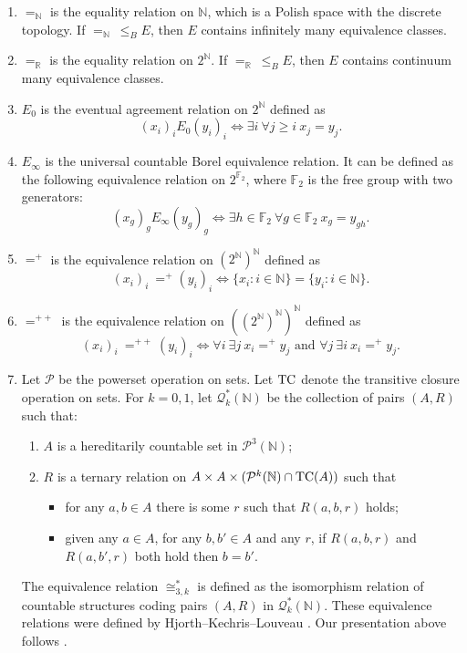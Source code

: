 \documentclass{amsart}
\theoremstyle{definition}
\theoremstyle{remark}
\begin{document}
\begin{enumerate}
\item $=_{\mathbb{N}}$ is the equality relation on $\mathbb{N}$, which is a Polish space with the discrete topology. If $=_{\mathbb{N}}\ \leq_B E$, then $E$ contains infinitely many equivalence classes.
\item $=_{\mathbb{R}}$ is the equality relation on $2^{\mathbb{N}}$. If $=_{\mathbb{R}}\ \leq_B E$, then $E$ contains continuum many equivalence classes.
\item $E_0$ is the eventual agreement relation on $2^{\mathbb{N}}$ defined as
$$ (x_i)_iE_0(y_i)_i\iff \exists i\ \forall j\geq i\ x_j=y_j. $$
\item $E_\infty$ is the universal countable Borel equivalence relation. It can be defined as the following equivalence relation on $2^{\mathbb{F}_2}$, where $\mathbb{F}_2$ is the free group with two generators:
$$ (x_g)_gE_\infty (y_g)_g \iff \exists h\in \mathbb{F}_2\ \forall g\in \mathbb{F}_2\ x_g=y_{gh}. $$
\item $=^+$ is the equivalence relation on $(2^\mathbb{N})^{\mathbb{N}}$ defined as
$$ (x_i)_i\ =^+ (y_i)_i\iff \{x_i\colon i\in \mathbb{N}\}=\{y_i\colon i\in\mathbb{N}\}. $$
\item $=^{++}$ is the equivalence relation on $((2^{\mathbb{N}})^{\mathbb{N}})^{\mathbb{N}}$ defined as
$$ (x_i)_i\ =^{++} (y_i)_i\iff \forall i\ \exists j\ x_i=^+ y_j \mbox{ and } \forall j\ \exists i\ x_i=^+y_j. $$
\item Let $\mathcal{P}$ be the powerset operation on sets. Let $\mbox{\rm TC}$ denote the transitive closure operation on sets. For $k=0,1$, let $\mathcal{Q}^*_k(\mathbb{N})$
be the collection of pairs $(A, R)$ such that:
\begin{enumerate}
\item[a)] $A$ is a hereditarily countable set in $\mathcal{P}^3(\mathbb{N})$;
\item[b)] $R$ is a ternary relation on $A\times A \times (\mathcal{P}^k(\mathbb{N}) \cap \mbox{\rm TC}(A))$ such that
\begin{itemize}
\item for any $a, b \in A$ there is some $r$ such that $R(a, b, r)$ holds;
\item given any $a \in A$, for any $b, b'\in A$ and any $r$, if $R(a, b, r)$ and $R(a, b',r)$ both 
hold then $b=b'$.
\end{itemize}
\end{enumerate}
The equivalence relation $\cong^*_{3,k}$ is deﬁned as the isomorphism relation of countable structures coding pairs $(A, R)$ in $\mathcal{Q}^*_k(\mathbb{N})$. These equivalence relations were defined by Hjorth--Kechris--Louveau \cite{HKL}. Our presentation above follows \cite{CMMRS}.

\end{enumerate}
\end{document}
